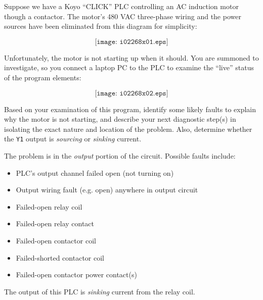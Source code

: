

Suppose we have a Koyo ``CLICK'' PLC controlling an AC induction motor though a contactor.  The motor's 480 VAC three-phase wiring and the power sources have been eliminated from this diagram for simplicity:

$$\texttt{[image: i02268x01.eps]}$$

Unfortunately, the motor is not starting up when it should.  You are summoned to investigate, so you connect a laptop PC to the PLC to examine the ``live'' status of the program elements:

$$\texttt{[image: i02268x02.eps]}$$

Based on your examination of this program, identify some likely faults to explain why the motor is not starting, and describe your next diagnostic step(s) in isolating the exact nature and location of the problem.  Also, determine whether the {\tt Y1} output is {\it sourcing} or {\it sinking} current.














The problem is in the {\it output} portion of the circuit.  Possible faults include:

\begin{itemize}
\item{} PLC's output channel failed open (not turning on)
\item{} Output wiring fault (e.g. open) anywhere in output circuit
\item{} Failed-open relay coil
\item{} Failed-open relay contact
\item{} Failed-open contactor coil
\item{} Failed-shorted contactor coil
\item{} Failed-open contactor power contact(s)
\end{itemize}

The output of this PLC is {\it sinking} current from the relay coil.

